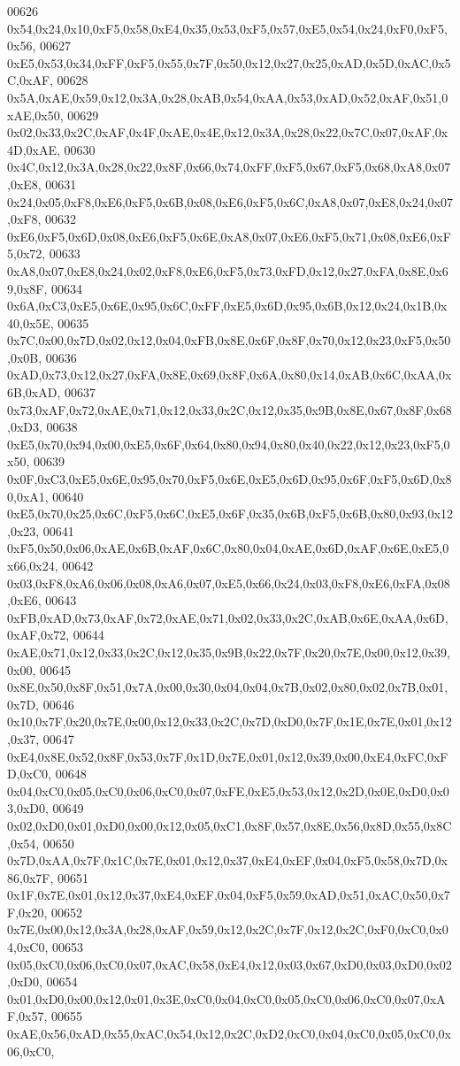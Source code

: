 \begin{DoxyCode}
00626 0x54,0x24,0x10,0xF5,0x58,0xE4,0x35,0x53,0xF5,0x57,0xE5,0x54,0x24,0xF0,0xF5,0x56,
00627 0xE5,0x53,0x34,0xFF,0xF5,0x55,0x7F,0x50,0x12,0x27,0x25,0xAD,0x5D,0xAC,0x5C,0xAF,
00628 0x5A,0xAE,0x59,0x12,0x3A,0x28,0xAB,0x54,0xAA,0x53,0xAD,0x52,0xAF,0x51,0xAE,0x50,
00629 0x02,0x33,0x2C,0xAF,0x4F,0xAE,0x4E,0x12,0x3A,0x28,0x22,0x7C,0x07,0xAF,0x4D,0xAE,
00630 0x4C,0x12,0x3A,0x28,0x22,0x8F,0x66,0x74,0xFF,0xF5,0x67,0xF5,0x68,0xA8,0x07,0xE8,
00631 0x24,0x05,0xF8,0xE6,0xF5,0x6B,0x08,0xE6,0xF5,0x6C,0xA8,0x07,0xE8,0x24,0x07,0xF8,
00632 0xE6,0xF5,0x6D,0x08,0xE6,0xF5,0x6E,0xA8,0x07,0xE6,0xF5,0x71,0x08,0xE6,0xF5,0x72,
00633 0xA8,0x07,0xE8,0x24,0x02,0xF8,0xE6,0xF5,0x73,0xFD,0x12,0x27,0xFA,0x8E,0x69,0x8F,
00634 0x6A,0xC3,0xE5,0x6E,0x95,0x6C,0xFF,0xE5,0x6D,0x95,0x6B,0x12,0x24,0x1B,0x40,0x5E,
00635 0x7C,0x00,0x7D,0x02,0x12,0x04,0xFB,0x8E,0x6F,0x8F,0x70,0x12,0x23,0xF5,0x50,0x0B,
00636 0xAD,0x73,0x12,0x27,0xFA,0x8E,0x69,0x8F,0x6A,0x80,0x14,0xAB,0x6C,0xAA,0x6B,0xAD,
00637 0x73,0xAF,0x72,0xAE,0x71,0x12,0x33,0x2C,0x12,0x35,0x9B,0x8E,0x67,0x8F,0x68,0xD3,
00638 0xE5,0x70,0x94,0x00,0xE5,0x6F,0x64,0x80,0x94,0x80,0x40,0x22,0x12,0x23,0xF5,0x50,
00639 0x0F,0xC3,0xE5,0x6E,0x95,0x70,0xF5,0x6E,0xE5,0x6D,0x95,0x6F,0xF5,0x6D,0x80,0xA1,
00640 0xE5,0x70,0x25,0x6C,0xF5,0x6C,0xE5,0x6F,0x35,0x6B,0xF5,0x6B,0x80,0x93,0x12,0x23,
00641 0xF5,0x50,0x06,0xAE,0x6B,0xAF,0x6C,0x80,0x04,0xAE,0x6D,0xAF,0x6E,0xE5,0x66,0x24,
00642 0x03,0xF8,0xA6,0x06,0x08,0xA6,0x07,0xE5,0x66,0x24,0x03,0xF8,0xE6,0xFA,0x08,0xE6,
00643 0xFB,0xAD,0x73,0xAF,0x72,0xAE,0x71,0x02,0x33,0x2C,0xAB,0x6E,0xAA,0x6D,0xAF,0x72,
00644 0xAE,0x71,0x12,0x33,0x2C,0x12,0x35,0x9B,0x22,0x7F,0x20,0x7E,0x00,0x12,0x39,0x00,
00645 0x8E,0x50,0x8F,0x51,0x7A,0x00,0x30,0x04,0x04,0x7B,0x02,0x80,0x02,0x7B,0x01,0x7D,
00646 0x10,0x7F,0x20,0x7E,0x00,0x12,0x33,0x2C,0x7D,0xD0,0x7F,0x1E,0x7E,0x01,0x12,0x37,
00647 0xE4,0x8E,0x52,0x8F,0x53,0x7F,0x1D,0x7E,0x01,0x12,0x39,0x00,0xE4,0xFC,0xFD,0xC0,
00648 0x04,0xC0,0x05,0xC0,0x06,0xC0,0x07,0xFE,0xE5,0x53,0x12,0x2D,0x0E,0xD0,0x03,0xD0,
00649 0x02,0xD0,0x01,0xD0,0x00,0x12,0x05,0xC1,0x8F,0x57,0x8E,0x56,0x8D,0x55,0x8C,0x54,
00650 0x7D,0xAA,0x7F,0x1C,0x7E,0x01,0x12,0x37,0xE4,0xEF,0x04,0xF5,0x58,0x7D,0x86,0x7F,
00651 0x1F,0x7E,0x01,0x12,0x37,0xE4,0xEF,0x04,0xF5,0x59,0xAD,0x51,0xAC,0x50,0x7F,0x20,
00652 0x7E,0x00,0x12,0x3A,0x28,0xAF,0x59,0x12,0x2C,0x7F,0x12,0x2C,0xF0,0xC0,0x04,0xC0,
00653 0x05,0xC0,0x06,0xC0,0x07,0xAC,0x58,0xE4,0x12,0x03,0x67,0xD0,0x03,0xD0,0x02,0xD0,
00654 0x01,0xD0,0x00,0x12,0x01,0x3E,0xC0,0x04,0xC0,0x05,0xC0,0x06,0xC0,0x07,0xAF,0x57,
00655 0xAE,0x56,0xAD,0x55,0xAC,0x54,0x12,0x2C,0xD2,0xC0,0x04,0xC0,0x05,0xC0,0x06,0xC0,

\end{DoxyCode}
